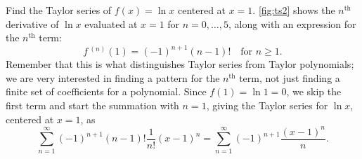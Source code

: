 \begin{example}[The Taylor series of $f(x)=\ln x$ at $x=1$]\label{ex_ts2}
Find the Taylor series of $f(x) = \ln x$ centered at $x=1$.
\solution
\autoref{fig:ts2} shows the $n^\text{th}$ derivative of $\ln x$ evaluated at $x=1$ for $n=0,\dotsc,5$, along with an expression for the $n^\text{th}$ term:
\[f\,^{(n)}(1) = (-1)^{n+1}(n-1)!\quad \text{for $n\geq 1$.}\]
Remember that this is what distinguishes Taylor series from Taylor polynomials; we are very interested in finding a pattern for the $n^\text{th}$ term, not just finding a finite set of coefficients for a polynomial.
Since $f(1) = \ln 1 = 0$, we skip the first term and start the summation with $n=1$, giving the Taylor series for $\ln x$, centered at $x=1$, as 
\[\sum_{n=1}^\infty (-1)^{n+1}(n-1)!\frac{1}{n!}(x-1)^n = \sum_{n=1}^\infty (-1)^{n+1}\frac{(x-1)^n}{n}.\]
\end{example}

